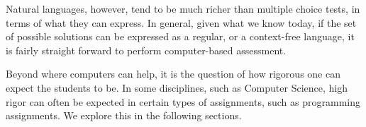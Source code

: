 Natural languages, however, tend to be much richer than multiple choice tests,
in terms of what they can express. In general, given what we know today, if the
set of possible solutions can be expressed as a regular, or a context-free
language, it is fairly straight forward to perform computer-based assessment.

Beyond where computers can help, it is the question of how rigorous one can
expect the students to be. In some disciplines, such as Computer Science, high
rigor can often be expected in certain types of assignments, such as
programming assignments. We explore this in the following sections.
















